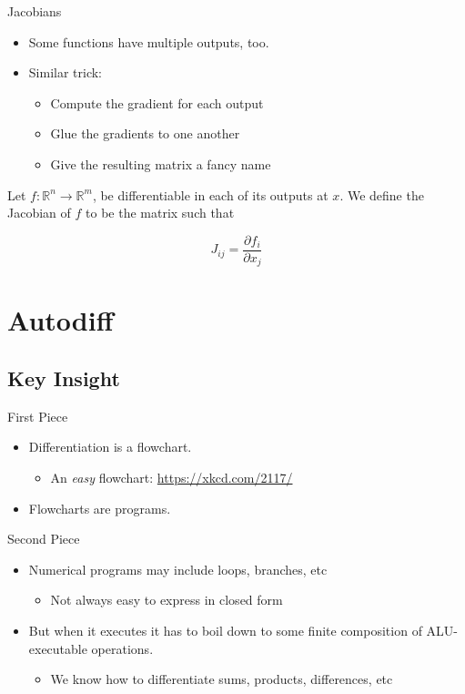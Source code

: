 \documentclass[pdf]{beamer}
\begin{document}
\begin{frame}{Jacobians}
  \begin{itemize}
  \item Some functions have multiple outputs, too.
  \item Similar trick:
    \begin{itemize}
    \item Compute the gradient for each output
    \item Glue the gradients to one another
    \item Give the resulting matrix a fancy name
    \end{itemize}
  \end{itemize}
  \pause
  \begin{definition}
    Let $f:\mathbb{R}^n\rightarrow\mathbb{R}^m$, be differentiable in each of its outputs at $x$. We define the Jacobian of $f$ to be the matrix such that

    \[ J_{ij} = \frac{\partial f_i}{\partial x_j} \]
  \end{definition}
\end{frame}

\section{Autodiff}
\subsection{Key Insight}
\begin{frame}{First Piece}
  \begin{itemize}
  \item Differentiation is a flowchart.
    \begin{itemize}
    \item An \emph{easy} flowchart: \url{https://xkcd.com/2117/}
    \end{itemize}
  \pause\item Flowcharts are programs.
  \end{itemize}
\end{frame}

\begin{frame}{Second Piece}
  \begin{itemize}
  \item Numerical programs may include loops, branches, etc
    \begin{itemize}
    \item Not always easy to express in closed form
    \end{itemize}
  \pause
  \item But when it executes it has to boil down to some finite composition of
    ALU-executable operations.
    \begin{itemize}
    \item We know how to differentiate sums, products, differences, etc
    \end{itemize}
  \end{itemize}
\end{frame}
\end{document}
